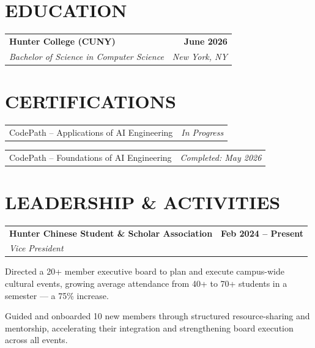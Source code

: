 \documentclass[letterpaper,10pt]{article}
\makeatletter
\newcommand{\rItem}[1]{\item\small\color{darknavy} #1}
\newcommand{\entryHead}[4]{%
  \vspace{2pt}%
  \begin{tabular*}{\textwidth}[t]{l@{\extracolsep{\fill}}r}
    \textbf{\color{darknavy}#1} & \textbf{\small\color{darkgray}#2}\\
    \textit{\small\color{darkgray}#3} & \textit{\small\color{darkgray}#4}\\
  \end{tabular*}\vspace{2pt}%
}
\newcommand{\certRow}[2]{%
  \vspace{1pt}%
  \begin{tabular*}{\textwidth}{l@{\extracolsep{\fill}}r}
    \small\color{darknavy}#1 & \textit{\small\color{darkgray}#2}\\
  \end{tabular*}\vspace{0pt}%
}
\makeatother
\begin{document}
\section{EDUCATION}
\entryHead{Hunter College (CUNY)}{June 2026}{Bachelor of Science in Computer Science}{New York, NY}
\vspace{-5pt}

\section{CERTIFICATIONS}
\certRow{CodePath -- Applications of AI Engineering}{In Progress}
\certRow{CodePath -- Foundations of AI Engineering}{Completed: May 2026}
\vspace{-10pt}

\section{LEADERSHIP \& ACTIVITIES}
\entryHead{Hunter Chinese Student \& Scholar Association}{Feb 2024 -- Present}{Vice President}{}
\begin{resumebullets}
  \rItem{Directed a 20+ member executive board to plan and execute campus-wide cultural events, growing average attendance from 40+ to 70+ students in a semester — a 75\% increase.}
  \rItem{Guided and onboarded 10 new members through structured resource-sharing and mentorship, accelerating their integration and strengthening board execution across all events.}
\end{resumebullets} 
\end{document}

